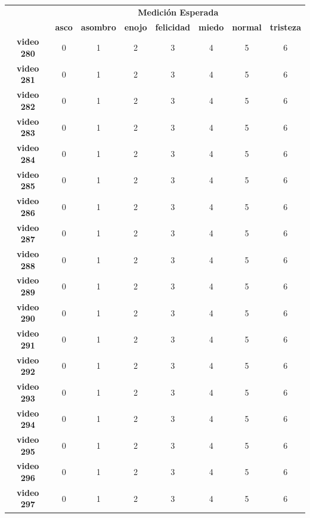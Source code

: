 \begin{table}[]
\centering
\begin{tabular}{c|c|c|c|c|c|c|c|}
\cline{2-8}
\multicolumn{1}{l|}{} & \multicolumn{7}{c|}{\bf Medición Esperada}                                                                                            \\ \cline{2-8} 
\multicolumn{1}{l|}{} & \textbf{asco} & \textbf{asombro} & \textbf{enojo} & \textbf{felicidad} & \textbf{miedo} & \textbf{normal} & \textbf{tristeza} \\ \hline
\multicolumn{1}{|c|}{\textbf{video 280}} & 0 & 1 & 2 & 3 & 4 & 5 & 6 \\ \hline
\multicolumn{1}{|c|}{\textbf{video 281}} & 0 & 1 & 2 & 3 & 4 & 5 & 6 \\ \hline
\multicolumn{1}{|c|}{\textbf{video 282}} & 0 & 1 & 2 & 3 & 4 & 5 & 6 \\ \hline
\multicolumn{1}{|c|}{\textbf{video 283}} & 0 & 1 & 2 & 3 & 4 & 5 & 6 \\ \hline
\multicolumn{1}{|c|}{\textbf{video 284}} & 0 & 1 & 2 & 3 & 4 & 5 & 6 \\ \hline
\multicolumn{1}{|c|}{\textbf{video 285}} & 0 & 1 & 2 & 3 & 4 & 5 & 6 \\ \hline
\multicolumn{1}{|c|}{\textbf{video 286}} & 0 & 1 & 2 & 3 & 4 & 5 & 6 \\ \hline
\multicolumn{1}{|c|}{\textbf{video 287}} & 0 & 1 & 2 & 3 & 4 & 5 & 6 \\ \hline
\multicolumn{1}{|c|}{\textbf{video 288}} & 0 & 1 & 2 & 3 & 4 & 5 & 6 \\ \hline
\multicolumn{1}{|c|}{\textbf{video 289}} & 0 & 1 & 2 & 3 & 4 & 5 & 6 \\ \hline
\multicolumn{1}{|c|}{\textbf{video 290}} & 0 & 1 & 2 & 3 & 4 & 5 & 6 \\ \hline
\multicolumn{1}{|c|}{\textbf{video 291}} & 0 & 1 & 2 & 3 & 4 & 5 & 6 \\ \hline
\multicolumn{1}{|c|}{\textbf{video 292}} & 0 & 1 & 2 & 3 & 4 & 5 & 6 \\ \hline
\multicolumn{1}{|c|}{\textbf{video 293}} & 0 & 1 & 2 & 3 & 4 & 5 & 6 \\ \hline
\multicolumn{1}{|c|}{\textbf{video 294}} & 0 & 1 & 2 & 3 & 4 & 5 & 6 \\ \hline
\multicolumn{1}{|c|}{\textbf{video 295}} & 0 & 1 & 2 & 3 & 4 & 5 & 6 \\ \hline
\multicolumn{1}{|c|}{\textbf{video 296}} & 0 & 1 & 2 & 3 & 4 & 5 & 6 \\ \hline
\multicolumn{1}{|c|}{\textbf{video 297}} & 0 & 1 & 2 & 3 & 4 & 5 & 6 \\ \hline

\end{tabular}
\end{table}
